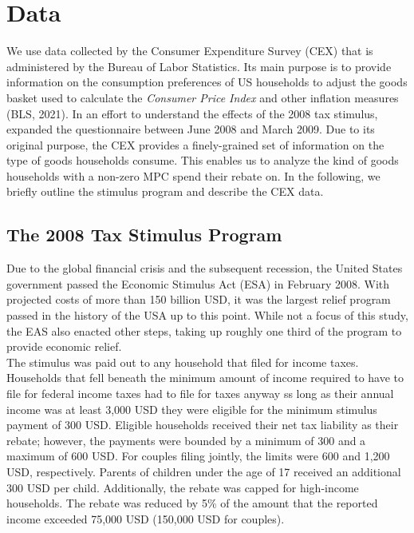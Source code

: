 \section{Data} \label{sec:data}
We use data collected by the Consumer Expenditure Survey (CEX) that is administered by the Bureau of Labor Statistics. Its main purpose is to provide information on the consumption preferences of US households to adjust the goods basket used to calculate the \textit{Consumer Price Index} and other inflation measures (BLS, 2021). In an effort to understand the effects of the 2008 tax stimulus, \cite{parker_etal_13} expanded the questionnaire between June 2008 and March 2009.  Due to its original purpose, the CEX provides a finely-grained set of information on the type of goods households consume. This enables us to analyze the kind of goods households with a non-zero MPC spend their rebate on. In the following, we briefly outline the stimulus program and describe the CEX data. 

\subsection{The 2008 Tax Stimulus Program} 
Due to the global financial crisis and the subsequent recession, the United States government passed the Economic Stimulus Act (ESA) in February 2008. With projected costs of more than 150 billion USD, it was the largest relief program passed in the history of the USA up to this point. While not a focus of this study, the EAS also enacted other steps, taking up roughly one third of the program to provide economic relief. \\
The stimulus was paid out to any household that filed for income taxes. Households that fell beneath the minimum amount of income required to have to file for federal income taxes had to file for taxes anyway ss long as their annual income was at least 3,000 USD they were eligible for the minimum stimulus payment of 300 USD. Eligible households received their net tax liability as their rebate; however, the payments were bounded by a minimum of 300 and a maximum of 600 USD. For couples filing jointly, the limits were 600 and 1,200 USD, respectively. Parents of children under the age of 17 received an additional 300 USD per child. Additionally, the rebate was capped for high-income households. The rebate was reduced by 5\% of the amount that the reported income exceeded 75,000 USD (150,000 USD for couples).


